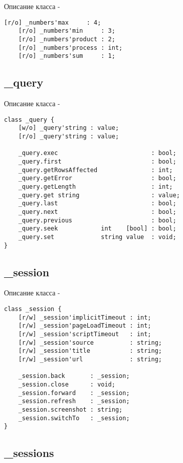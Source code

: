 \noindent Описание класса  -
\begin{lstlisting}[numbers=none]
	[r/o] _numbers'max     : 4;
	[r/o] _numbers'min     : 3;
	[r/o] _numbers'product : 2;
	[r/o] _numbers'process : int;
	[r/o] _numbers'sum     : 1;
\end{lstlisting}

\subsection{{\color{orange} \_query}}

\noindent Описание класса  -
\begin{lstlisting}[numbers=none]
class _query {
	[w/o] _query'string : value;
	[r/o] _query'string : value;
	
	_query.exec                          : bool;
	_query.first                         : bool;
	_query.getRowsAffected               : int;
	_query.getError                      : bool;
	_query.getLength                     : int;
	_query.get string                    : value;
	_query.last                          : bool;
	_query.next                          : bool;
	_query.previous                      : bool;
	_query.seek            int    [bool] : bool;
	_query.set             string value  : void;
}
\end{lstlisting}

\subsection{{\color{orange} \_session}}

\noindent Описание класса  -
\begin{lstlisting}[numbers=none]
class _session {
	[r/w] _session'implicitTimeout : int;
	[r/w] _session'pageLoadTimeout : int;
	[r/w] _session'scriptTimeout   : int;
	[r/w] _session'source          : string;
	[r/w] _session'title           : string;
	[r/w] _session'url             : string;
	
	_session.back       : _session;
	_session.close      : void;
	_session.forward    : _session;
	_session.refresh    : _session;
	_session.screenshot : string;
	_session.switchTo   : _session;
}
\end{lstlisting}

\subsection{{\color{orange} \_sessions}}

